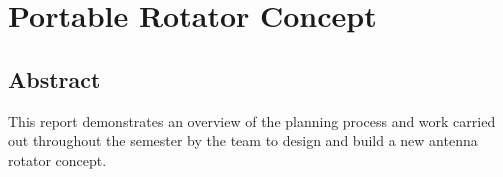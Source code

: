 %
%



\newcommand{\st}{Official Documentation - WP400\\
	SIERRA BEEGND \\
	Project SatCom 2021}       %
\newcommand{\nr}{SatCom-21-Doc-WP400}       %
\newcommand{\ver}{0.1}                      %
\newcommand{\dat}{\today}                   %




\DeclareOldFontCommand{\sl}{\normalfont\slshape}{\@nomath\sl}
\graphicspath{{../img/}{../texdata/}}    %
\usepackage{tocloft}
\usepackage{hyperref}
\newcommand{\mailto}[1]{\href{mailto:#1}{#1}}
\renewcommand\cftchapnumwidth{2.8em}

	\renewcommand{\thisauthor}{SatCom 2021}
	
	
	\clearpage
	
	\tableofcontents
	\newpage
	\listoffigures
	
	
	\clearpage
	\def\thechapter{\arabic{chapter}00}
	\setcounter{chapter}{3}
	\chapter{Portable Rotator Concept}
	
	
	\section*{Abstract}
	
	This report demonstrates an overview of the planning process and work carried out throughout the semester by the team to design and build a new antenna rotator concept.
	
